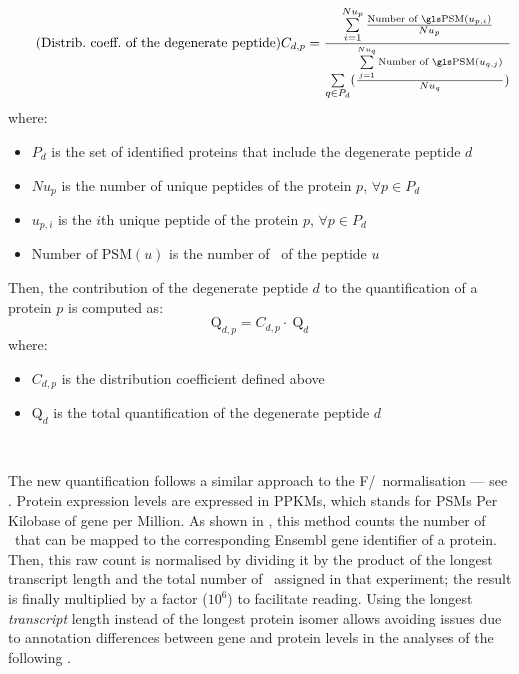 \begin{minipage}{\textwidth}
\begin{equation}
     \tag{Distrib.\ coeff.\ of the degenerate peptide}\label{eq:distribDegen}
     C_{d,p}=\frac{%
     \sum\limits_{i=1}^{Nu_p}\frac{\text{Number of \psm}(u_{p,i})}{Nu_p}
     }{%
     \sum\limits_{q\in P_d}(\frac{\sum\limits_{j=1}^{Nu_q}\text{Number of \psm}(u_{q,j})}{Nu_q})
     }
\end{equation}
where:{\small
\begin{itemize}[topsep=0pt,nosep]
    \item $P_d$ is the set of identified proteins that include the degenerate peptide $d$
    \item $Nu_p$ is the number of unique peptides of the protein $p$, $\forall p  \in P_d$
    \item $u_{p,i}$ is the $i$th unique peptide of the protein $p$, $\forall p  \in P_d$
    \item $\text{Number of PSM}(u)$ is the number of \psms\ of the peptide $u$
\end{itemize}
}
\end{minipage}

\begin{minipage}{\textwidth}
Then, the contribution of the degenerate peptide $d$
to the quantification of a protein $p$ is computed as:
\begin{equation}
    \tag{Distribution of the degenerate peptide quantification to a protein}
    \text{Q}_{d,p}=C_{d,p} \cdot\ \text{Q}_d
\end{equation}
where:{\small
\begin{itemize}[topsep=0pt,nosep]
    \item $C_{d,p}$ is the distribution coefficient defined above
    \item $\text{Q}_d$ is the total quantification of
        the degenerate peptide $d$
\end{itemize}
}
\end{minipage}
\cbend\

The new quantification follows a similar approach to the F/\RPKM\ normalisation ---
see .
Protein expression levels are expressed in \glspl{PPKM},
which stands for \glspl{PSM} Per Kilobase of gene per Million.
As shown in ,
this method counts the number of \psms\
that can be mapped to the corresponding \gls{Ensembl} gene identifier of a protein.
Then, this raw count is normalised by dividing it
by the product of the longest transcript length and the total number of \psms\
assigned in that experiment;
the result is finally multiplied by a factor ($10^6$) to facilitate reading.
Using the longest \emph{transcript} length
instead of the longest protein isomer allows avoiding issues due to
annotation differences between gene and protein levels
in the analyses of the following \Cref{ch:Integration}.\mybr\


